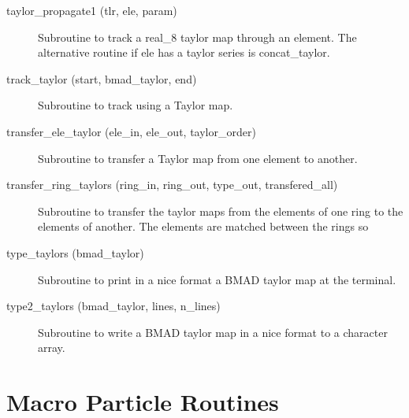 \begin{description}
\item[taylor\_propagate1 (tlr, ele, param)] \Newline
Subroutine to track a real\_8 taylor map through an element. The alternative routine if ele has a taylor series is concat\_taylor. 

\item[track\_taylor (start, bmad\_taylor, end)] \Newline
Subroutine to track using a Taylor map. 

\item[transfer\_ele\_taylor (ele\_in, ele\_out, taylor\_order)] \Newline 
     Subroutine to transfer a Taylor map from one element to another.

\item[transfer\_ring\_taylors (ring\_in, ring\_out, 
                                             type\_out, transfered\_all) ] \Newline 
     Subroutine to transfer the taylor maps from the elements of one ring to
     the elements of another. The elements are matched between the rings so 

\item[type\_taylors (bmad\_taylor)] \Newline
Subroutine to print in a nice format a BMAD taylor map at the terminal. 

\item[type2\_taylors (bmad\_taylor, lines, n\_lines)] \Newline
Subroutine to write a BMAD taylor map in a nice format to a character array. 

\end{description}

\section{Macro Particle Routines}
\label{r:macro}    

